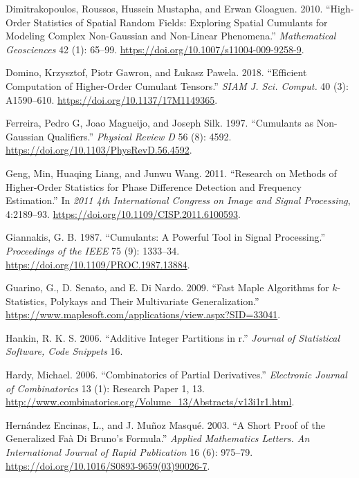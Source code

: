 \begin{CSLReferences}{1}{0}
\leavevmode{}%
Dimitrakopoulos, Roussos, Hussein Mustapha, and Erwan Gloaguen. 2010. {``High-Order Statistics of Spatial Random Fields: Exploring Spatial Cumulants for Modeling Complex Non-{G}aussian and Non-Linear Phenomena.''} \emph{Mathematical Geosciences} 42 (1): 65--99. \url{https://doi.org/10.1007/s11004-009-9258-9}.

\leavevmode{}%
Domino, Krzysztof, Piotr Gawron, and Łukasz Pawela. 2018. {``Efficient Computation of Higher-Order Cumulant Tensors.''} \emph{SIAM J. Sci. Comput.} 40 (3): A1590--610. \url{https://doi.org/10.1137/17M1149365}.

\leavevmode{}%
Ferreira, Pedro G, Joao Magueijo, and Joseph Silk. 1997. {``Cumulants as Non-Gaussian Qualifiers.''} \emph{Physical Review D} 56 (8): 4592. \url{https://doi.org/10.1103/PhysRevD.56.4592}.

\leavevmode{}%
Geng, Min, Huaqing Liang, and Junwu Wang. 2011. {``Research on Methods of Higher-Order Statistics for Phase Difference Detection and Frequency Estimation.''} In \emph{2011 4th International Congress on Image and Signal Processing}, 4:2189--93. \url{https://doi.org/10.1109/CISP.2011.6100593}.

\leavevmode{}%
Giannakis, G. B. 1987. {``Cumulants: A Powerful Tool in Signal Processing.''} \emph{Proceedings of the IEEE} 75 (9): 1333--34. \url{https://doi.org/10.1109/PROC.1987.13884}.

\leavevmode{}%
Guarino, G., D. Senato, and E. Di Nardo. 2009. {``Fast Maple Algorithms for \(k\)-Statistics, Polykays and Their Multivariate Generalization.''} \url{https://www.maplesoft.com/applications/view.aspx?SID=33041}.

\leavevmode{}%
Hankin, R. K. S. 2006. {``Additive Integer Partitions in r.''} \emph{Journal of Statistical Software, Code Snippets} 16.

\leavevmode{}%
Hardy, Michael. 2006. {``Combinatorics of Partial Derivatives.''} \emph{Electronic Journal of Combinatorics} 13 (1): Research Paper 1, 13. \url{http://www.combinatorics.org/Volume_13/Abstracts/v13i1r1.html}.

\leavevmode{}%
Hernández Encinas, L., and J. Muñoz Masqué. 2003. {``A Short Proof of the Generalized {F}aà Di {B}runo's Formula.''} \emph{Applied Mathematics Letters. An International Journal of Rapid Publication} 16 (6): 975--79. \url{https://doi.org/10.1016/S0893-9659(03)90026-7}.


\end{CSLReferences}
